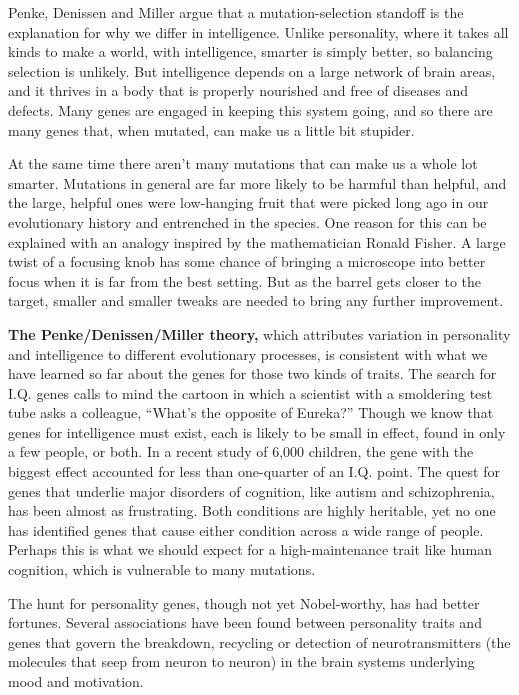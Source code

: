 Penke, Denissen and Miller argue that a mutation-selection standoff is
the explanation for why we differ in intelligence. Unlike personality,
where it takes all kinds to make a world, with intelligence, smarter is
simply better, so balancing selection is unlikely. But intelligence
depends on a large network of brain areas, and it thrives in a body that
is properly nourished and free of diseases and defects. Many genes are
engaged in keeping this system going, and so there are many genes that,
when mutated, can make us a little bit stupider.

At the same time there aren't many mutations that can make us a whole
lot smarter. Mutations in general are far more likely to be harmful than
helpful, and the large, helpful ones were low-hanging fruit that were
picked long ago in our evolutionary history and entrenched in the
species. One reason for this can be explained with an analogy inspired
by the mathematician Ronald Fisher. A large twist of a focusing knob has
some chance of bringing a microscope into better focus when it is far
from the best setting. But as the barrel gets closer to the target,
smaller and smaller tweaks are needed to bring any further improvement.

\textbf{The Penke/Denissen/Miller theory,} which attributes variation in
personality and intelligence to different evolutionary processes, is
consistent with what we have learned so far about the genes for those
two kinds of traits. The search for I.Q. genes calls to mind the cartoon
in which a scientist with a smoldering test tube asks a colleague,
``What's the opposite of Eureka?'' Though we know that genes for
intelligence must exist, each is likely to be small in effect, found in
only a few people, or both. In a recent study of 6,000 children, the
gene with the biggest effect accounted for less than one-quarter of an
I.Q. point. The quest for genes that underlie major disorders of
cognition, like autism and schizophrenia, has been almost as
frustrating. Both conditions are highly heritable, yet no one has
identified genes that cause either condition across a wide range of
people. Perhaps this is what we should expect for a high-maintenance
trait like human cognition, which is vulnerable to many mutations.

The hunt for personality genes, though not yet Nobel-worthy, has had
better fortunes. Several associations have been found between
personality traits and genes that govern the breakdown, recycling or
detection of neurotransmitters (the molecules that seep from neuron to
neuron) in the brain systems underlying mood and motivation.

